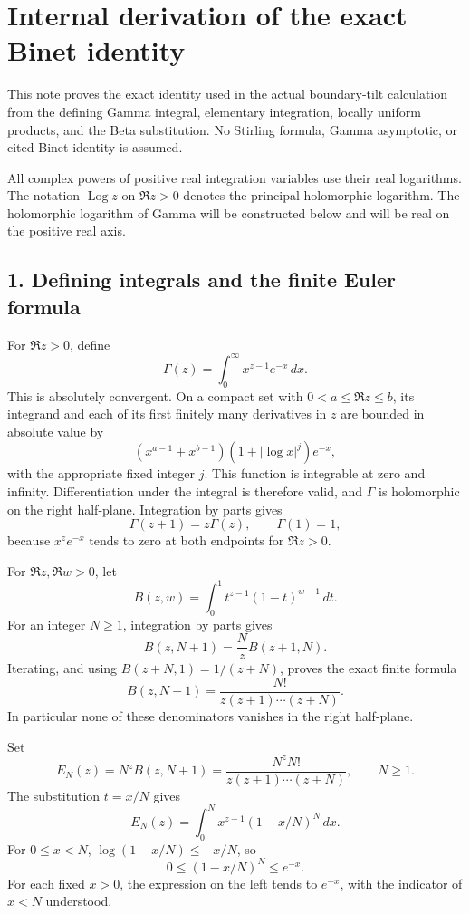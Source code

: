 \section{Internal derivation of the exact Binet identity}\label{GraphV2:internal-derivation-of-the-exact-binet-identity}

This note proves the exact identity used in the actual boundary-tilt calculation from the defining Gamma integral, elementary integration, locally uniform products, and the Beta substitution. No Stirling formula, Gamma asymptotic, or cited Binet identity is assumed.

All complex powers of positive real integration variables use their real logarithms. The notation \(\operatorname{Log}z\) on \(\Re z>0\) denotes the principal holomorphic logarithm. The holomorphic logarithm of Gamma will be constructed below and will be real on the positive real axis.

\subsection{1. Defining integrals and the finite Euler formula}\label{GraphV2:defining-integrals-and-the-finite-euler-formula}

For \(\Re z>0\), define \[
\Gamma(z)=\int_0^\infty x^{z-1}e^{-x}\,dx.
\tag{BI1}
\] This is absolutely convergent. On a compact set with \(0<a\le\Re z\le b\), its integrand and each of its first finitely many derivatives in \(z\) are bounded in absolute value by \[
(x^{a-1}+x^{b-1})(1+|\log x|^j)e^{-x},
\] with the appropriate fixed integer \(j\). This function is integrable at zero and infinity. Differentiation under the integral is therefore valid, and \(\Gamma\) is holomorphic on the right half-plane. Integration by parts gives \[
\Gamma(z+1)=z\Gamma(z),
\qquad \Gamma(1)=1,
\tag{BI2}
\] because \(x^ze^{-x}\) tends to zero at both endpoints for \(\Re z>0\).

For \(\Re z,\Re w>0\), let \[
B(z,w)=\int_0^1 t^{z-1}(1-t)^{w-1}\,dt.
\tag{BI3}
\] For an integer \(N\ge1\), integration by parts gives \[
B(z,N+1)=\frac{N}{z}B(z+1,N).
\] Iterating, and using \(B(z+N,1)=1/(z+N)\), proves the exact finite formula \[
B(z,N+1)=\frac{N!}{z(z+1)\cdots(z+N)}.
\tag{BI4}
\] In particular none of these denominators vanishes in the right half-plane.

Set \[
E_N(z)=N^zB(z,N+1)
=\frac{N^zN!}{z(z+1)\cdots(z+N)},\qquad N\ge1.
\tag{BI5}
\] The substitution \(t=x/N\) gives \[
E_N(z)=\int_0^N x^{z-1}(1-x/N)^N\,dx.
\tag{BI6}
\] For \(0\le x<N\), \(\log(1-x/N)\le-x/N\), so \[
0\le(1-x/N)^N\le e^{-x}.
\] For each fixed \(x>0\), the expression on the left tends to \(e^{-x}\), with the indicator of \(x<N\) understood.

